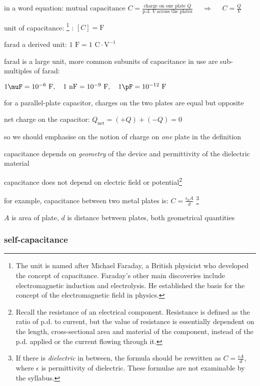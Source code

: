 in a word equation: $\text{mutual capacitance } C = \frac{\text{charge on one plate }Q }{\text{p.d. } V \text{ across the plates}}$ $\quad \Rightarrow \quad$ $\boxed{C = \frac{Q}{V}}$


\cmt unit of capacitance: 
\footnote{The unit is named after Michael Faraday, a British physicist who developed the concept of capacitance. Faraday's other main discoveries include electromagnetic induction and electrolysis. He established the basis for the concept of the electromagnetic field in physics.}
: $[C] = \text{F}$

farad a derived unit: $1 \text{ F} = 1 \text{ C}\cdot\text{V}^{-1}$

farad is a large unit, more common subunits of capacitance in use are sub-multiples of farad:

$1 \muF = 10^{-6} \text{ F}, \quad 1 \text{ nF} = 10^{-9} \text{ F}, \quad 1 \pF = 10^{-12} \text{ F}$

\cmt for a parallel-plate capacitor, charges on the two plates are equal but opposite

net charge on the capacitor: $Q_\text{net} = (+Q)+(-Q)=0$

so we should emphasise on the notion of charge on \emph{one} plate in the definition



\cmt capacitance depends on \emph{geometry} of the device and permittivity of the dielectric material

capacitance does not depend on electric field or potential\footnote{Recall the resistance of an electrical component. Resistance is defined as the ratio of p.d. to current, but the value of resistance is essentially dependent on the length, cross-sectional area and material of the component, instead of the p.d. applied or the current flowing through it.}

for example, capacitance between two metal plates is: $C=\frac{\epsilon_0 A}{d}$
\footnote{If there is \emph{dielectric} in between, the formula should be rewritten as $C = \frac{\epsilon A}{d}$, where $\epsilon$ is permittivity of dielectric. These formulae are not examinable by the syllabus.}

$A$ is area of plate, $d$ is distance between plates, both geometrical quantities


\subsubsection{self-capacitance}

